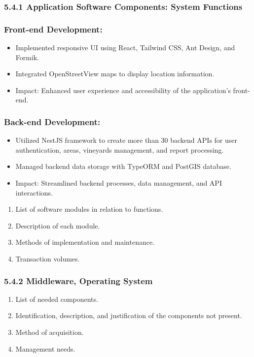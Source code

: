\subsubsection{5.4.1 Application Software Components: System Functions}
\subsubsection{Front-end Development:}
\begin{itemize}
    \item Implemented responsive UI using React, Tailwind CSS, Ant Design, and Formik.
    \item Integrated OpenStreetView maps to display location information.
    \item Impact: Enhanced user experience and accessibility of the application's front-end.
\end{itemize}

\subsubsection{Back-end Development:}
\begin{itemize}
    \item Utilized NestJS framework to create more than 30 backend APIs for user authentication, areas, vineyards management, and report processing.
    \item Managed backend data storage with TypeORM and PostGIS database.
    \item Impact: Streamlined backend processes, data management, and API interactions.
\end{itemize}
\begin{enumerate}
    \item List of software modules in relation to functions.
    \item Description of each module.
    \item Methods of implementation and maintenance.
    \item Transaction volumes.
\end{enumerate}

\subsubsection{5.4.2 Middleware, Operating System}
\begin{enumerate}
    \item List of needed components.
    \item Identification, description, and justification of the components not present.
    \item Method of acquisition.
    \item Management needs.
\end{enumerate}

